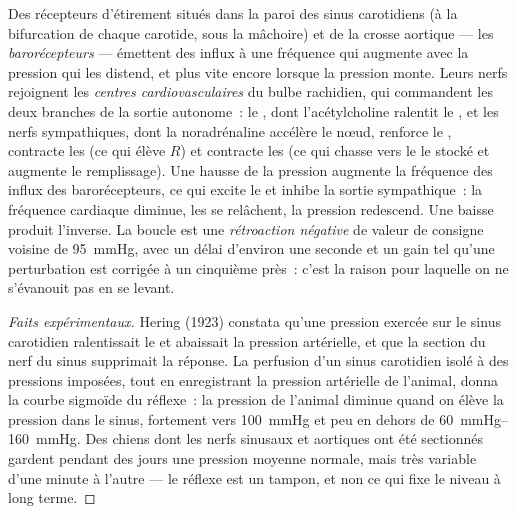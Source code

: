 \begin{definition}[Le baroréflexe]\label{def:b2:blood-pressure:baroreflex}
Des récepteurs d'étirement situés dans la paroi des sinus carotidiens (à
la bifurcation de chaque  carotide, sous la mâchoire) et de la
crosse aortique --- les \emph{barorécepteurs} --- émettent des influx à
une fréquence qui augmente avec la pression qui les distend, et plus
vite encore lorsque la pression monte. Leurs nerfs rejoignent les
\emph{centres cardiovasculaires} du bulbe rachidien, qui commandent les
deux branches de la sortie autonome~: le , dont l'acétylcholine
ralentit le , et les nerfs sympathiques, dont la
noradrénaline accélère le nœud, renforce le , contracte les
 (ce qui élève $R$) et contracte les  (ce qui chasse
vers le  le  stocké et augmente le remplissage). Une hausse de la
pression augmente la fréquence des influx des barorécepteurs, ce qui
excite le  et inhibe la sortie sympathique~: la fréquence
cardiaque diminue, les  se relâchent, la pression redescend.
Une baisse produit l'inverse. La boucle est une \emph{rétroaction
négative} de valeur de consigne voisine de \qty{95}{mmHg}, avec un délai
d'environ une seconde et un gain tel qu'une perturbation est corrigée à
un cinquième près~: c'est la raison pour laquelle on ne s'évanouit pas en
se levant.
\end{definition}
\begin{proof}[Faits expérimentaux]
Hering (1923) constata qu'une pression exercée sur le sinus carotidien
ralentissait le  et abaissait la pression artérielle, et que la
section du nerf du sinus supprimait la réponse. La perfusion d'un sinus
carotidien isolé à des pressions imposées, tout en enregistrant la
pression artérielle de l'animal, donna la courbe sigmoïde du réflexe~:
la pression de l'animal diminue quand on élève la pression dans le
sinus, fortement vers \qty{100}{mmHg} et peu en dehors de
\qtyrange{60}{160}{mmHg}. Des chiens dont les nerfs sinusaux et aortiques
ont été sectionnés gardent pendant des jours une pression moyenne
normale, mais très variable d'une minute à l'autre --- le réflexe est un
tampon, et non ce qui fixe le niveau à long terme.
\end{proof}

